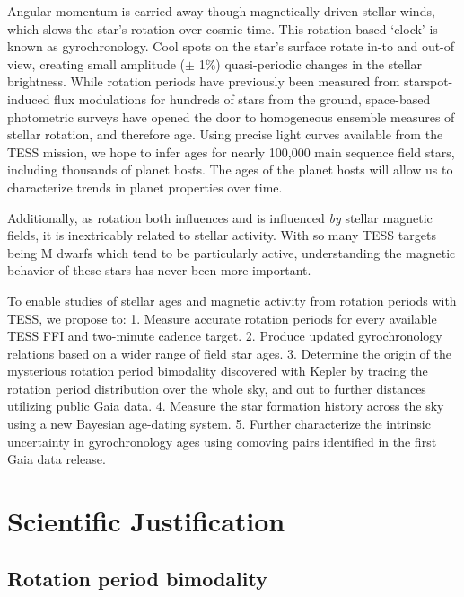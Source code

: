 \documentclass[useAMS, usenatbib, preprint, 12pt]{aastex}
\begin{document}
Angular momentum is carried away though magnetically driven stellar winds,
which slows the star’s rotation over cosmic time.
This rotation-based `clock' is known as gyrochronology.
Cool spots on the star’s surface rotate in-to and out-of view, creating small
amplitude ($\pm$ 1\%) quasi-periodic changes in the stellar brightness.
While rotation periods have previously been measured from starspot-induced
flux modulations for hundreds of stars from the ground, space-based
photometric surveys have opened the door to homogeneous ensemble measures of
stellar rotation, and therefore age.
Using precise light curves available from the TESS mission, we hope to
infer ages for nearly 100,000 main sequence field stars, including thousands
of planet hosts.
The ages of the planet hosts will allow us to characterize trends in planet
properties over time.

Additionally, as rotation both influences and is influenced {\it by} stellar
magnetic fields, it is inextricably related to stellar activity.
With so many TESS targets being M dwarfs which tend to be particularly active,
understanding the magnetic behavior of these stars has never been more
important.

To enable studies of stellar ages and magnetic activity from rotation periods
with TESS, we propose to:
1. Measure accurate rotation periods for every available TESS FFI and
two-minute cadence target.
2. Produce updated gyrochronology relations based on a wider range of field
star ages.
3. Determine the origin of the mysterious rotation period bimodality
discovered with Kepler by tracing the rotation period distribution over the
whole sky, and out to further distances utilizing public Gaia data.
4. Measure the star formation history across the sky using a new Bayesian
age-dating system.
5. Further characterize the intrinsic uncertainty in gyrochronology ages using
comoving pairs identified in the first Gaia data release.

\section{Scientific Justification}
\subsection{Rotation period bimodality}
\end{document}
